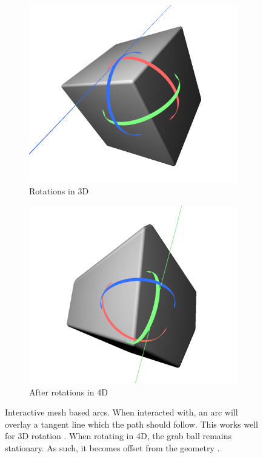 \documentclass{l4proj}
\begin{document}
\begin{figure}
  \hspace{1.6cm}
  \begin{subfigure}[b]{0.35\textwidth}
    \includegraphics[width=\textwidth]{images/rotation/grabball-3D.PNG}
    \caption{
      Rotations in 3D
    }
    \label{fig:grab1}
  \end{subfigure}
  \hspace{0.8cm}
  \begin{subfigure}[b]{0.35\textwidth}
    \includegraphics[width=\textwidth]{images/rotation/grabball-3D-offset.PNG}
    \caption{
      After rotations in 4D
    }
    \label{fig:grab2}
  \end{subfigure}
  \label{fig:grabballs-arcs}
  \caption{
    Interactive mesh based arcs. When interacted with, an arc will overlay a tangent line which the path should follow. This works well for 3D rotation . When rotating in 4D, the grab ball remains stationary. As such, it becomes offset from the geometry .
  }
\end{figure}
\end{document}
